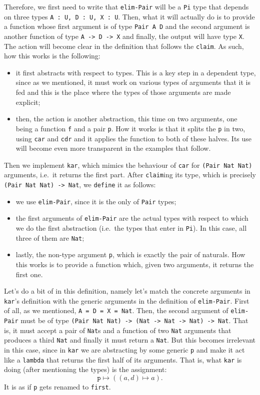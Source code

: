 Therefore, we first need to write that \texttt{elim-Pair} will be a \texttt{Pi}
type that depends on three types \texttt{A : U, D : U, X : U}. Then, what it will
actually do is to provide a function whose first argument is of type
\texttt{Pair A D} and the second argument is another function of type
\texttt{A -> D -> X} and finally, the output will have type \texttt{X}. The action
will become clear in the definition that follows the \texttt{claim}.
As such, how this works is the following:
\begin{itemize}
\item it first abstracts with respect to types. This is a key step in a dependent
  type, since as we mentioned, it must work on various types of arguments that
  it is fed and this is the place where the types of those arguments are made
  explicit;
\item then, the action is another abstraction, this time on two arguments, one
  being a function \texttt{f} and a pair \texttt{p}. How it works is that it splits
  the \texttt{p} in two, using \texttt{car} and \texttt{cdr} and it applies the
  function to both of these halves. Its use will become even more transparent
  in the examples that follow.
\end{itemize}

Then we implement \texttt{kar}, which mimics the behaviour of \texttt{car}
for \texttt{(Pair Nat Nat)} arguments, i.e.\ it returns the first part.
After \texttt{claim}ing its type, which is precisely \texttt{(Pair Nat Nat) -> Nat},
we \texttt{define} it as follows:
\begin{itemize}
\item we use \texttt{elim-Pair}, since it is the only  of \texttt{Pair}
  types;
\item the first arguments of \texttt{elim-Pair} are the actual types with respect
  to which we do the first abstraction (i.e.\ the types that enter in \texttt{Pi}).
  In this case, all three of them are \texttt{Nat};
\item lastly, the non-type argument \texttt{p}, which is exactly the pair of
  naturals. How this works is to provide a function which, given two arguments, it
  returns the first one.
\end{itemize}

Let's do a bit of  in this definition, namely let's match
the concrete arguments in \texttt{kar}'s definition with the generic arguments
in the definition of \texttt{elim-Pair}. First of all, as we mentioned,
\texttt{A = D = X = Nat}. Then, the second argument of \texttt{elim-Pair}
must be of type \texttt{(Pair Nat Nat) -> (Nat -> Nat -> Nat) -> Nat}.
That is, it must accept a pair of \texttt{Nat}s and a function of two
\texttt{Nat} arguments that produces a third \texttt{Nat} and finally it
must return a \texttt{Nat}. But this becomes irrelevant in this case, since
in \texttt{kar} we are abstracting by some generic \texttt{p} and make it
act like a \texttt{lambda} that returns the first half of its arguments.
That is, what \texttt{kar} is doing (after mentioning the types) is the assignment:
\[
  \texttt{p} \mapsto \left( (a, d) \mapsto a \right).
\]
It is as if \texttt{p} gets renamed to \texttt{first}.

